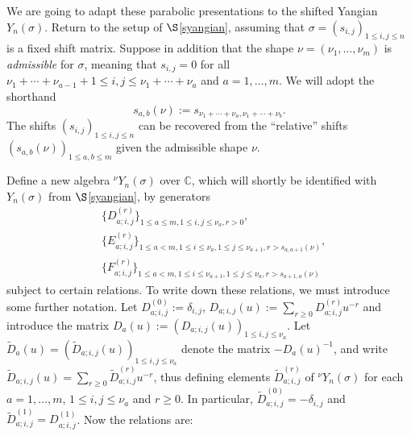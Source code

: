 \documentclass[twoside,12pt,reqno]{amsart}
\def\C{{\mathbb C}}
\begin{document}
We are going to adapt these parabolic presentations to the shifted
Yangian $Y_n(\sigma)$. Return to the setup of $\S$\ref{syangian},
assuming that $\sigma = (s_{i,j})_{1 \leq i, j \leq n}$ is a 
fixed shift matrix.
Suppose in addition that the shape $\nu = (\nu_1,\dots,\nu_m)$ is 
{\em admissible} for $\sigma$, meaning that
$s_{i,j} = 0$ for all $\nu_1+\cdots+\nu_{a-1}+1 \leq i,j 
\leq \nu_1+\cdots+\nu_a$
and $a=1,\dots,m$. We will adopt the shorthand
\begin{equation}\label{rels}
s_{a,b}(\nu) := s_{\nu_1+\cdots+\nu_a,\nu_1+\cdots+\nu_b}.
\end{equation}
The shifts $(s_{i,j})_{1 \leq i,j \leq n}$ can be recovered from the
``relative'' shifts $(s_{a,b}(\nu))_{1 \leq a,b \leq m}$ 
given the admissible shape $\nu$.

Define a new algebra ${^\nu}Y_n(\sigma)$ over $\C$, which will shortly be
{identified} with $Y_n(\sigma)$ from $\S$\ref{syangian},
by
generators 
\begin{align*}
&\{D_{a;i,j}^{(r)}\}_{1 \leq a \leq m, 1 \leq i,j \leq \nu_a,
r > 0},\\
&\{E_{a;i,j}^{(r)}\}_{1 \leq a < m, 1 \leq i 
\leq \nu_a, 1 \leq j \leq \nu_{a+1},
r > s_{a,a+1}(\nu)},\\
&\{F_{a;i,j}^{(r)}\}_{1 \leq a < m, 1 \leq i 
\leq \nu_{a+1}, 1 \leq j \leq \nu_{a},
r > s_{a+1,a}(\nu)}
\end{align*}
subject to certain relations. 
To write down these relations,
we must introduce some further notation.
Let $D_{a;i,j}^{(0)} := \delta_{i,j}$, 
$D_{a;i,j}(u) := \sum_{r \geq 0} D_{a;i,j}^{(r)} u^{-r}$
and introduce the matrix 
$D_a(u) := (D_{a;i,j}(u))_{1 \leq i,j \leq \nu_a}$.
Let $\widetilde{D}_a(u) = 
(\widetilde{D}_{a;i,j}(u))_{1 \leq i,j \leq \nu_a}$
denote the matrix $-D_a(u)^{-1}$, and write $\widetilde{D}_{a;i,j}(u) =
\sum_{r \geq 0} \widetilde D_{a;i,j}^{(r)} u^{-r}$,
thus defining elements $\widetilde{D}_{a;i,j}^{(r)}$
of ${^\nu}Y_n(\sigma)$ for each $a=1,\dots,m$, $1 \leq i,j \leq \nu_a$
and $r \geq 0$.
In particular, $\widetilde{D}_{a;i,j}^{(0)} = - \delta_{i,j}$
and $\widetilde{D}_{a;i,j}^{(1)} = D_{a;i,j}^{(1)}$.
Now the relations are:
\end{document}

